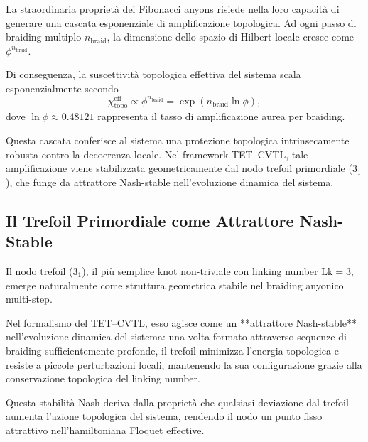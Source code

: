\documentclass[11pt,a4paper]{article}
\theoremstyle{plain}
\theoremstyle{definition}
\begin{document}
La straordinaria proprietà dei Fibonacci anyons risiede nella loro capacità di generare una cascata esponenziale di amplificazione topologica. Ad ogni passo di braiding multiplo $n_\text{braid}$, la dimensione dello spazio di Hilbert locale cresce come $\phi^{n_\text{braid}}$. 


\vspace{0.2cm}


Di conseguenza, la suscettività topologica effettiva del sistema scala esponenzialmente secondo
\begin{equation}
\chi_\text{topo}^\text{eff} \propto \phi^{n_\text{braid}} = \exp\left(n_\text{braid} \ln\phi\right),
\label{eq:golden_cascade}
\end{equation}
dove $\ln\phi \approx 0.48121$ rappresenta il tasso di amplificazione aurea per braiding.


\vspace{0.2cm}

Questa cascata conferisce al sistema una protezione topologica intrinsecamente robusta contro la decoerenza locale. Nel framework TET--CVTL, tale amplificazione viene stabilizzata geometricamente dal nodo trefoil primordiale ($3_1$), che funge da attrattore Nash-stable nell'evoluzione dinamica del sistema.








\subsection{Il Trefoil Primordiale come Attrattore Nash-Stable}

Il nodo trefoil ($3_1$), il più semplice knot non-triviale con linking number $\text{Lk}=3$, emerge naturalmente come struttura geometrica stabile nel braiding anyonico multi-step. 

\vspace{0.2cm}

Nel formalismo del TET--CVTL, esso agisce come un **attrattore Nash-stable** nell'evoluzione dinamica del sistema: una volta formato attraverso sequenze di braiding sufficientemente profonde, il trefoil minimizza l'energia topologica e resiste a piccole perturbazioni locali, mantenendo la sua configurazione grazie alla conservazione topologica del linking number.


\vspace{0.2cm}

Questa stabilità Nash deriva dalla proprietà che qualsiasi deviazione dal trefoil aumenta l'azione topologica del sistema, rendendo il nodo un punto fisso attrattivo nell'hamiltoniana Floquet effective. 
\end{document}

